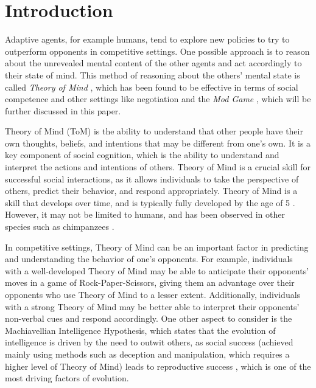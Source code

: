 \section{Introduction}\label{sec:introduction}

Adaptive agents, for example humans, tend to explore new policies to try to outperform opponents in competitive settings. One possible approach is to reason about the unrevealed mental content of the other agents and act accordingly to their state of mind. This method of reasoning about the others' mental state is called \textit{Theory of Mind} \citep{premack1978does}, which has been found to be effective in terms of social competence \citep{liddle2006higher} and other settings like negotiation \citep{de2017negotiating} and the \textit{Mod Game} \citep{veltman2019training}, which will be further discussed in this paper.

Theory of Mind (ToM) is the ability to understand that other people have their own thoughts, beliefs, and intentions that may be different from one's own. It is a key component of social cognition, which is the ability to understand and interpret the actions and intentions of others. Theory of Mind is a crucial skill for successful social interactions, as it allows individuals to take the perspective of others, predict their behavior, and respond appropriately. Theory of Mind is a skill that develops over time, and is typically fully developed by the age of 5 \citep{call2008does}. However, it may not be limited to humans, and has been observed in other species such as chimpanzees \citep{premack1978does}.

In competitive settings, Theory of Mind can be an important factor in predicting and understanding the behavior of one's opponents. For example, individuals with a well-developed Theory of Mind may be able to anticipate their opponents' moves in a game of Rock-Paper-Scissors, giving them an advantage over their opponents who use Theory of Mind to a lesser extent\citep{de2013much}. Additionally, individuals with a strong Theory of Mind may be better able to interpret their opponents' non-verbal cues and respond accordingly. One other aspect to consider is the Machiavellian Intelligence Hypothesis, which states that the evolution of intelligence is driven by the need to outwit others, as social success (achieved mainly using methods such as deception and manipulation, which requires a higher level of Theory of Mind) leads to reproductive success \citep{gavrilets2006dynamics}, which is one of the most driving factors of evolution.

